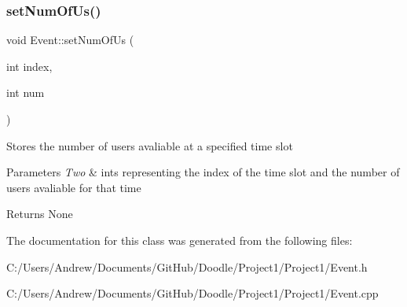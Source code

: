 \subsubsection{\texorpdfstring{set\+Num\+Of\+Us()}{setNumOfUs()}}
{\footnotesize\ttfamily void Event\+::set\+Num\+Of\+Us (\begin{DoxyParamCaption}\item[{int}]{index,  }\item[{int}]{num }\end{DoxyParamCaption})}

Stores the number of users avaliable at a specified time slot 
\begin{DoxyParams}{Parameters}
{\em Two} & ints representing the index of the time slot and the number of users avaliable for that time \\
\hline
\end{DoxyParams}
\begin{DoxyReturn}{Returns}
None 
\end{DoxyReturn}


The documentation for this class was generated from the following files\+:\begin{DoxyCompactItemize}
\item 
C\+:/\+Users/\+Andrew/\+Documents/\+Git\+Hub/\+Doodle/\+Project1/\+Project1/Event.\+h\item 
C\+:/\+Users/\+Andrew/\+Documents/\+Git\+Hub/\+Doodle/\+Project1/\+Project1/Event.\+cpp\end{DoxyCompactItemize}
